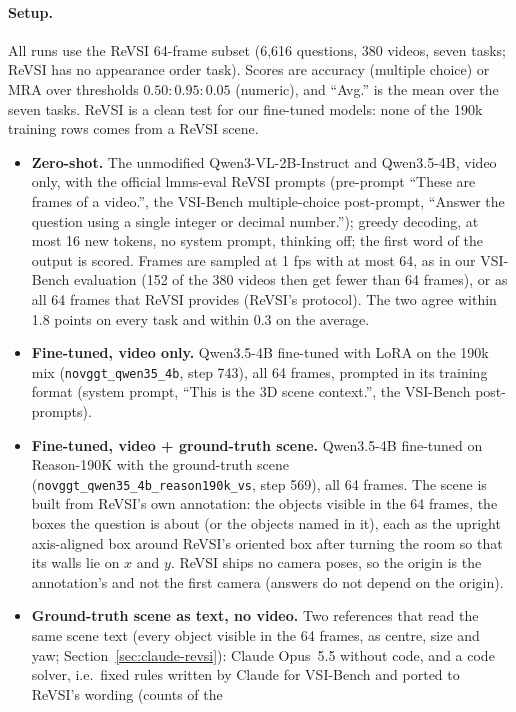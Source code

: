 \paragraph{Setup.}
All runs use the ReVSI 64-frame subset (6,616 questions, 380 videos, seven tasks; ReVSI has no appearance order
task). Scores are accuracy (multiple choice) or MRA over thresholds $0.50{:}0.95{:}0.05$ (numeric), and ``Avg.''
is the mean over the seven tasks. ReVSI is a clean test for our fine-tuned models: none of the 190k training rows
comes from a ReVSI scene.
\begin{itemize}
\item \textbf{Zero-shot.} The unmodified Qwen3-VL-2B-Instruct and Qwen3.5-4B, video only, with the official
lmms-eval ReVSI prompts (pre-prompt ``These are frames of a video.'', the VSI-Bench multiple-choice post-prompt,
``Answer the question using a single integer or decimal number.''); greedy decoding, at most 16 new tokens, no
system prompt, thinking off; the first word of the output is scored. Frames are sampled at 1 fps with at most 64, as
in our VSI-Bench evaluation (152 of the 380 videos then get fewer than 64 frames), or as all 64 frames that ReVSI
provides (ReVSI's protocol). The two agree within 1.8 points on every task and within 0.3 on the average.
\item \textbf{Fine-tuned, video only.} Qwen3.5-4B fine-tuned with LoRA on the 190k mix (\texttt{novggt\_\allowbreak qwen35\_\allowbreak 4b},
step 743), all 64 frames, prompted in its training format (system prompt, ``This is the 3D scene context.'', the
VSI-Bench post-prompts).
\item \textbf{Fine-tuned, video + ground-truth scene.} Qwen3.5-4B fine-tuned on Reason-190K with the ground-truth
scene (\texttt{novggt\_\allowbreak qwen35\_\allowbreak 4b\_\allowbreak reason190k\_\allowbreak vs}, step 569), all 64 frames. The scene is built from ReVSI's own
annotation: the objects visible in the 64 frames, the boxes the question is about (or the objects named in it), each
as the upright axis-aligned box around ReVSI's oriented box after turning the room so that its walls lie on $x$ and
$y$. ReVSI ships no camera poses, so the origin is the annotation's and not the first camera (answers do not depend
on the origin).
\item \textbf{Ground-truth scene as text, no video.} Two references that read the same scene text (every object
visible in the 64 frames, as centre, size and yaw; Section~\ref{sec:claude-revsi}): Claude Opus~5.5 without code,
and a code solver, i.e.\ fixed rules written by Claude for VSI-Bench and ported to ReVSI's wording (counts of the

\end{itemize}
